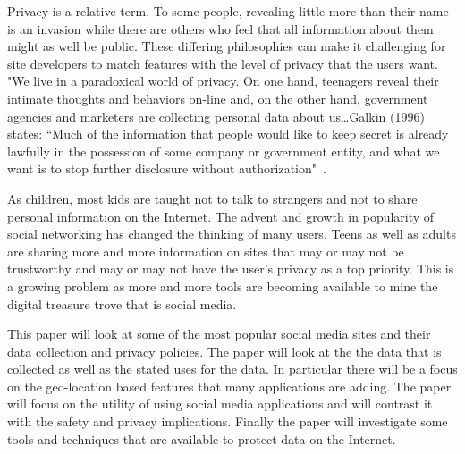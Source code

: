 Privacy is a relative term. To some people, revealing little more than their
name is an invasion while there are others who feel that all information about
them might as well be public. These differing philosophies can make it
challenging for site developers to match features with the level of privacy that
the users want. "We live in a paradoxical world of privacy. On one hand,
teenagers reveal their intimate thoughts and behaviors on-line and, on the other
hand, government agencies and marketers are collecting personal data about
us\ldots Galkin (1996) states: “Much of the information that people would like
to keep secret is already lawfully in the possession of some company or
government entity, and what we want is to stop further disclosure without
authorization"~\cite{barnes2006privacy}.

As children, most kids are taught not to talk to strangers and not to share
personal information on the Internet. The advent and growth in popularity of
social networking has changed the thinking of many users. Teens as well as
adults are sharing more and more information on sites that may or may not be
trustworthy and may or may not have the user's privacy as a top priority. This is a growing
problem as more and more tools are becoming available to mine the digital
treasure trove that is social media.

This paper will look at some of the most popular social media sites and their
data collection and privacy policies. The paper will look at the the data that is
collected as well as the stated uses for the data. In particular there will be a
focus on the geo-location based features that many applications are adding. The
paper will focus on the utility of using social media applications and will
contrast it with the safety and privacy implications. Finally the paper will
investigate some tools and techniques that are available to protect data on the
Internet.
